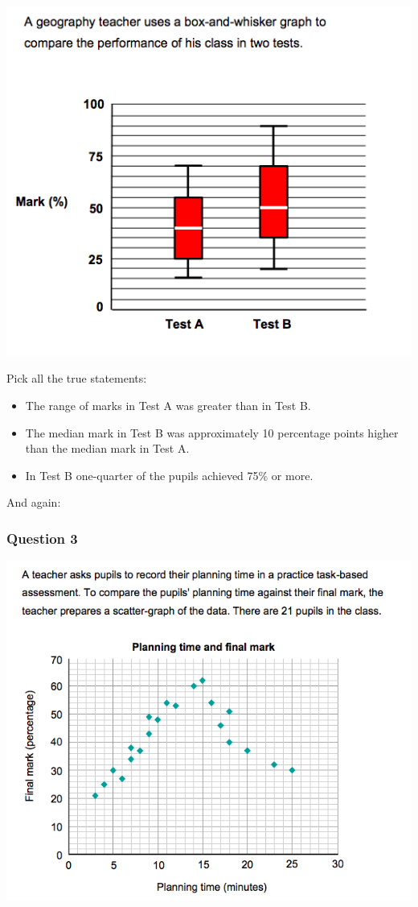 \documentclass[
]{book}
\providecommand{\tightlist}{%
  \setlength{\itemsep}{0pt}\setlength{\parskip}{0pt}}
\begin{document}
\includegraphics{imgs/numtest_2.png}

Pick all the true statements:

\begin{itemize}
\tightlist
\item
  The range of marks in Test A was greater than in Test B.
\item
  The median mark in Test B was approximately 10 percentage points higher than the median mark in Test A.
\item
  In Test B one-quarter of the pupils achieved 75\% or more.
\end{itemize}

And again:

\hypertarget{question-3}{%
\subsubsection*{Question 3}\label{question-3}}

\includegraphics{imgs/numtest_3.png}
\end{document}
